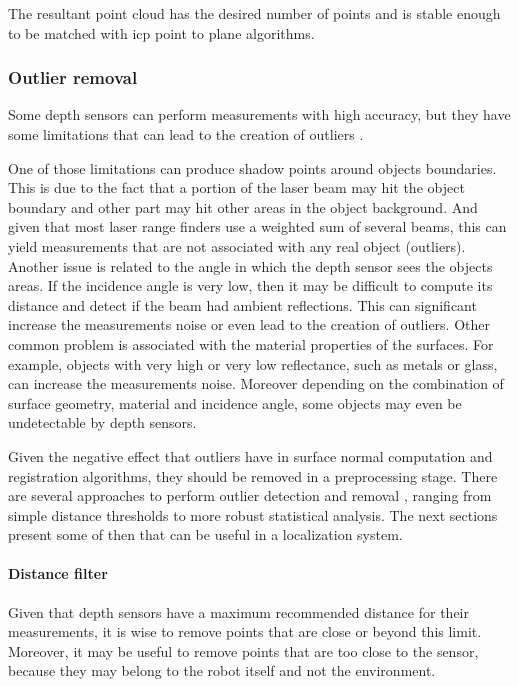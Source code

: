 The resultant point cloud has the desired number of points and is stable enough to be matched with \gls{icp} point to plane algorithms.


\subsubsection{Outlier removal}

Some depth sensors can perform measurements with high accuracy, but they have some limitations that can lead to the creation of outliers \cite{Sotoodeh2006}.

One of those limitations can produce shadow points around objects boundaries. This is due to the fact that a portion of the laser beam may hit the object boundary and other part may hit other areas in the object background. And given that most laser range finders use a weighted sum of several beams, this can yield measurements that are not associated with any real object (outliers). Another issue is related to the angle in which the depth sensor sees the objects areas. If the incidence angle is very low, then it may be difficult to compute its distance and detect if the beam had ambient reflections. This can significant increase the measurements noise or even lead to the creation of outliers. Other common problem is associated with the material properties of the surfaces. For example, objects with very high or very low reflectance, such as metals or glass, can increase the measurements noise. Moreover depending on the combination of surface geometry, material and incidence angle, some objects may even be undetectable by depth sensors.

Given the negative effect that outliers have in surface normal computation and registration algorithms, they should be removed in a preprocessing stage. There are several approaches to perform outlier detection and removal \cite{YangZhang2010}, ranging from simple distance thresholds to more robust statistical analysis. The next sections present some of then that can be useful in a localization system.


\paragraph{Distance filter}

Given that depth sensors have a maximum recommended distance for their measurements, it is wise to remove points that are close or beyond this limit. Moreover, it may be useful to remove points that are too close to the sensor, because they may belong to the robot itself and not the environment.

